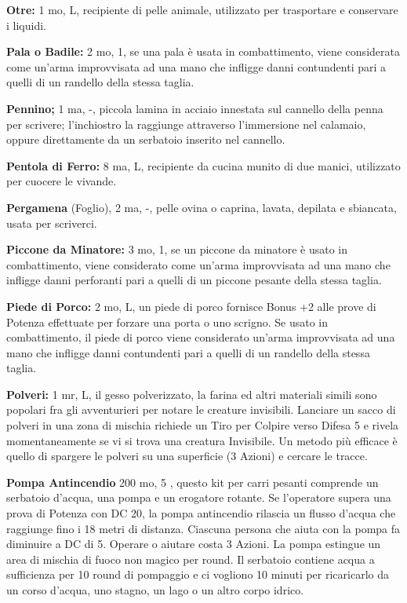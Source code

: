 \documentclass[a4paper,11pt,twoside,openany]{book}
\begin{document}
{\textbf{Otre:} 1 mo, L, recipiente di pelle animale, utilizzato per trasportare e conservare i liquidi.

\textbf{Pala o Badile:} 2 mo, 1, se una pala è usata in combattimento, viene considerata come un'arma improvvisata ad una mano che infligge danni contundenti pari a quelli di un randello della stessa taglia. 

\textbf{Pennino;} 1 ma, -, piccola lamina in acciaio innestata sul cannello della penna per scrivere; l'inchiostro la raggiunge attraverso l'immersione nel calamaio, oppure direttamente da un serbatoio inserito nel cannello.

\textbf{Pentola di Ferro:} 8 ma, L, recipiente da cucina munito di due manici, utilizzato per cuocere le vivande.

\textbf{Pergamena} (Foglio), 2 ma, -, pelle ovina o caprina, lavata, depilata e sbiancata, usata per scriverci.

\textbf{Piccone da Minatore:} 3 mo, 1, se un piccone da minatore è usato in combattimento, viene considerato come un'arma improvvisata ad una mano che infligge danni perforanti pari a quelli di un piccone pesante della stessa taglia.

\textbf{Piede di Porco:} 2 mo, L, un piede di porco fornisce Bonus +2 alle prove di Potenza effettuate per forzare una porta o uno scrigno. Se usato in combattimento, il piede di porco viene considerato un'arma improvvisata ad una mano che infligge danni contundenti pari a quelli di un randello della stessa taglia.

\textbf{Polveri:} 1 mr, L, il gesso polverizzato, la farina ed altri materiali simili sono popolari fra gli avventurieri per notare le creature invisibili. Lanciare un sacco di polveri in una zona di mischia richiede un Tiro per Colpire verso Difesa 5 e rivela momentaneamente se vi si trova una creatura Invisibile. Un metodo più efficace è quello di spargere le polveri su una superficie (3 Azioni) e cercare le tracce.

\textbf{Pompa Antincendio} 200 mo, 5 , questo kit per carri pesanti comprende un serbatoio d'acqua, una pompa e un erogatore rotante. Se l'operatore supera una prova di Potenza con DC 20, la pompa antincendio rilascia un flusso d'acqua che raggiunge fino i 18 metri di distanza. Ciascuna persona che aiuta con la pompa fa diminuire a DC di 5. Operare o aiutare costa 3 Azioni. La pompa estingue un area di mischia di fuoco non magico per round. Il serbatoio contiene acqua a sufficienza per 10 round di pompaggio e ci vogliono 10 minuti per ricaricarlo da un corso d'acqua, uno stagno, un lago o un altro corpo idrico.

}
\end{document}
